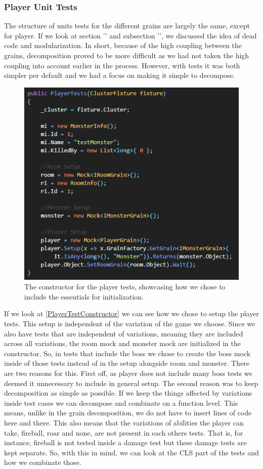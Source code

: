 \subsubsection{Player Unit Tests} \label{playerUnit}
The structure of units tests for the different grains are largely the same, except for player. If we look at section '' and subsection '', we discussed the idea of dead code and modularization. In short, because of the high coupling between the grains, decomposition proved to be more difficult as we had not taken the high coupling into account earlier in the process. However, with tests it was both simpler per default and we had a focus on making it simple to decompose. \\
\begin{figure}[h]
    \centering
    \includegraphics[width=0.7\linewidth]{Materials/TestingDiscussion/PlayerTestConstructor}
    \caption{The constructor for the player tests, showcasing how we chose to include the essentials for initialization.}
    \label{PlayerTestConstructor}
\end{figure}
If we look at \autoref{PlayerTestConstructor} we can see how we chose to setup the player tests. This setup is independent of the variation of the game we choose. Since we also have tests that are independent of variations, meaning they are included across all variations, the room mock and monster mock are initialized in the constructor. So, in tests that include the boss we chose to create the boss mock inside of those tests instead of in the setup alongside room and monster. There are two reasons for this. First off, as player does not include many boss tests we deemed it unnecessary to include in general setup. The second reason was to keep decomposition as simple as possible. If we keep the things affected by variations inside test cases we can decompose and combinate on a function level. This means, unlike in the grain decomposition, we do not have to insert lines of code here and there. This also means that the variations of abilities the player can take, fireball, roar and none, are not present in each others tests. That is, for instance, fireball is not tested inside a damage test but these damage tests are kept separate. So, with this in mind, we can look at the CLS part of the tests and how we combinate those. \\
